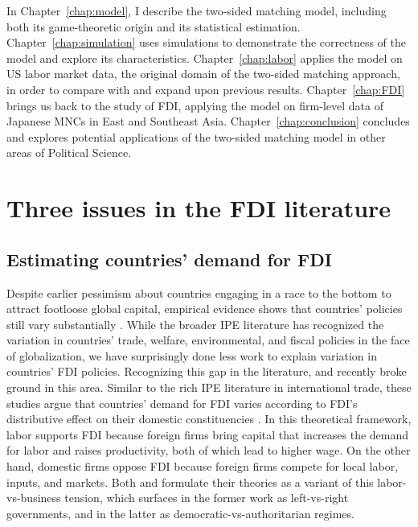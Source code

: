 In Chapter~\ref{chap:model}, I describe the two-sided matching model, including
both its game-theoretic origin and its statistical estimation.
Chapter~\ref{chap:simulation} uses simulations to demonstrate the correctness of
the model and explore its characteristics. Chapter~\ref{chap:labor} applies the
model on US labor market data, the original domain of the two-sided matching
approach, in order to compare with and expand upon previous results.
Chapter~\ref{chap:FDI} brings us back to the study of FDI, applying the model on
firm-level data of Japanese MNCs in East and Southeast Asia.
Chapter~\ref{chap:conclusion} concludes and explores potential applications of
the two-sided matching model in other areas of Political Science.

\section{Three issues in the FDI literature}
\label{sec:literature_issues}

\subsection{Estimating countries' demand for FDI}

Despite earlier pessimism about countries engaging in a race to the bottom to
attract footloose global capital, empirical evidence shows that countries'
policies still vary substantially \citep{Drezner2001}. While the broader IPE
literature has recognized the variation in countries' trade, welfare,
environmental, and fiscal policies in the face of globalization, we have
surprisingly done less work to explain variation in countries' FDI policies.
Recognizing this gap in the literature, \citet{Pinto2013} and \citet{Pandya2016}
recently broke ground in this area. Similar to the rich IPE literature in
international trade, these studies argue that countries' demand for FDI varies
according to FDI's distributive effect on their domestic constituencies
\citep{Broz2001, Milner2005a}. In this theoretical framework, labor supports FDI
because foreign firms bring capital that increases the demand for labor and
raises productivity, both of which lead to higher wage. On the other hand,
domestic firms oppose FDI because foreign firms compete for local labor, inputs,
and markets. Both \citet{Pinto2013} and \citet{Pandya2016} formulate their
theories as a variant of this labor-vs-business tension, which surfaces in the
former work as left-vs-right governments, and in the latter as
democratic-vs-authoritarian regimes.

